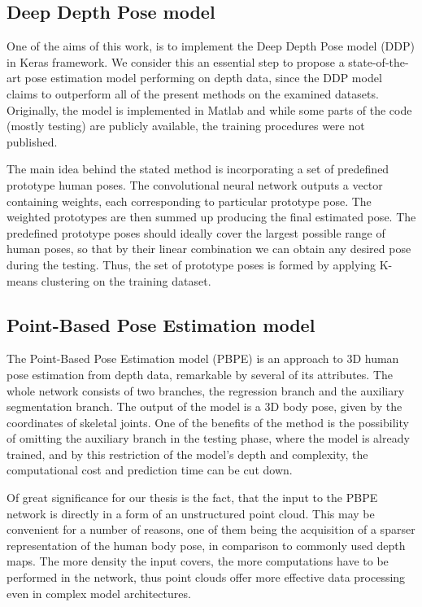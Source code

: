 \subsection{Deep Depth Pose model}
One of the aims of this work, is to implement the Deep Depth Pose model (DDP) \cite{Marin18jvcir} in Keras framework. We consider this an essential step to propose a state-of-the-art pose estimation model performing on depth data, since the DDP model claims to outperform all of the present methods on the examined datasets. Originally, the model is implemented in Matlab and while some parts of the code (mostly testing) are publicly available, the training procedures were not published.\par
\vspace{5mm}
\noindent
The main idea behind the stated method is incorporating a set of predefined prototype human poses. The convolutional neural network outputs a vector containing weights, each corresponding to particular prototype pose. The weighted prototypes are then summed up producing the final estimated pose. The predefined prototype poses should ideally cover the largest possible range of human poses, so that by their linear combination we can obtain any desired pose during the testing. Thus, the set of prototype poses is formed by applying K-means clustering on the training dataset.

\subsection{Point-Based Pose Estimation model}

The Point-Based Pose Estimation model (PBPE) \cite{Ali19} is an approach to 3D human pose estimation from depth data, remarkable by several of its attributes. The whole network consists of two branches, the regression branch and the auxiliary segmentation branch. The output of the model is a 3D body pose, given by the coordinates of skeletal joints. One of the benefits of the method is the possibility of omitting the auxiliary branch in the testing phase, where the model is already trained, and by this restriction of the model's depth and complexity, the computational cost and prediction time can be cut down.\par
\vspace{5mm}
\noindent Of great significance for our thesis is the fact, that the input to the PBPE network is directly in a form of an unstructured point cloud. This may be convenient for a number of reasons, one of them being the acquisition of a sparser representation of the human body pose, in comparison to commonly used depth maps. The more density the input covers, the more computations have to be performed in the network, thus point clouds offer more effective data processing even in complex model architectures.\par
\vspace{5mm}




